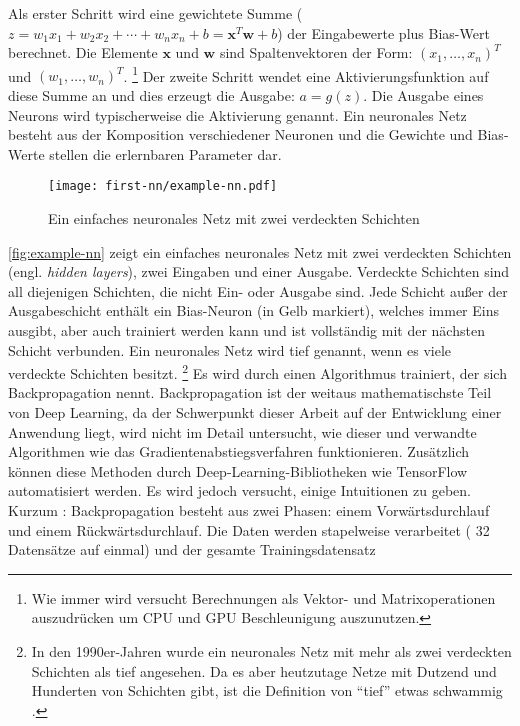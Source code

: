 \noindent
Als erster Schritt wird eine gewichtete Summe
($z = w_1x_1 + w_2x_2 +\dotsb+ w_nx_n + b = \mathbf{x}^T\mathbf{w} + b$)
der Eingabewerte plus Bias-Wert berechnet. Die Elemente $\mathbf{x}$ und $\mathbf{w}$
sind Spaltenvektoren der Form: $(x_1,\dotsc,x_n)^T$ und $(w_1,\dotsc,w_n)^T$.
\footnote{Wie immer wird versucht Berechnungen als Vektor- und Matrixoperationen
auszudrücken um CPU und GPU Beschleunigung auszunutzen.}
Der zweite Schritt wendet eine Aktivierungsfunktion auf diese Summe an und dies
erzeugt die Ausgabe: $a = g(z)$. Die Ausgabe eines Neurons
wird typischerweise die Aktivierung genannt. Ein neuronales Netz
besteht aus der Komposition verschiedener Neuronen und die
Gewichte und Bias-Werte stellen die erlernbaren Parameter dar.
\begin{figure}[h!]
  \centering
  \texttt{[image: first-nn/example-nn.pdf]}
  \caption{Ein einfaches neuronales Netz mit zwei verdeckten Schichten}
  \label{fig:example-nn}
\end{figure}
\noindent
\autoref{fig:example-nn} zeigt ein einfaches neuronales Netz
mit zwei verdeckten Schichten (engl. \textit{hidden layers}),
zwei Eingaben und einer Ausgabe.
Verdeckte Schichten sind all diejenigen Schichten, die nicht Ein- oder Ausgabe sind.
Jede Schicht außer der Ausgabeschicht enthält ein Bias-Neuron
(in Gelb markiert), welches immer Eins ausgibt, aber auch trainiert werden kann
und ist vollständig mit der nächsten Schicht verbunden.
Ein neuronales Netz wird tief genannt, wenn es viele verdeckte Schichten besitzt.
\footnote{In den 1990er-Jahren wurde ein neuronales Netz
mit mehr als zwei verdeckten Schichten als tief angesehen.
Da es aber heutzutage Netze mit Dutzend und Hunderten von Schichten
gibt, ist die Definition von \enquote{tief} etwas schwammig \parencite[289]{book:hands-on-ml}.}
Es wird durch einen Algorithmus trainiert, der
sich Backpropagation nennt.
Backpropagation ist der weitaus mathematischste Teil von
Deep Learning, da der Schwerpunkt dieser Arbeit auf der Entwicklung einer
Anwendung liegt, wird nicht im Detail untersucht,
wie dieser und verwandte Algorithmen wie das Gradientenabstiegsverfahren
funktionieren. Zusätzlich können diese Methoden durch Deep-Learning-Bibliotheken
wie TensorFlow automatisiert werden. Es wird jedoch versucht, einige
Intuitionen zu geben.\\[8pt]
Kurzum \parencite[290-291]{book:hands-on-ml}:
Backpropagation besteht aus zwei Phasen: einem Vorwärtsdurchlauf
und einem Rückwärtsdurchlauf. Die Daten werden stapelweise verarbeitet
(\zB{} 32 Datensätze auf ein­mal) und der gesamte Trainingsdatensatz
